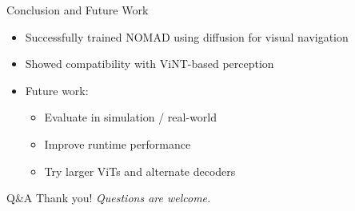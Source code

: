 \documentclass{beamer}
\begin{document}
\begin{frame}{Conclusion and Future Work}
\begin{itemize}
    \item Successfully trained NOMAD using diffusion for visual navigation
    \item Showed compatibility with ViNT-based perception
    \item Future work:
    \begin{itemize}
        \item Evaluate in simulation / real-world
        \item Improve runtime performance
        \item Try larger ViTs and alternate decoders
    \end{itemize}
\end{itemize}
\end{frame}

\begin{frame}{Q\&A}
Thank you! \newline
\textit{Questions are welcome.}
\end{frame}
\end{document}
